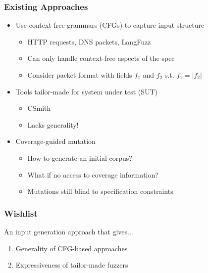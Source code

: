\documentclass[11pt,xcolor={dvipsnames},hyperref={pdftex,pdfpagemode=UseNone,hidelinks,pdfdisplaydoctitle=true},usepdftitle=false]{beamer}
\newcommand{\green}[1]{\textcolor{green!60!black}{#1}}
\newcommand{\blue}[1]{\textcolor{blue!70!black}{#1}}
\begin{document}
\begin{frame} 
    \frametitle{Existing Approaches} 
    \begin{itemize}
        \item Use \green{context-free grammars} (CFGs) to capture input structure \pause
        \begin{itemize}
            \item HTTP requests, DNS packets, LangFuzz\pause
            \item Can only handle context-free aspects of the spec\pause
            \item Consider packet format with fields 
            \blue{$f_1$} and \blue{$f_2$} s.t. \blue{$f_1 = |f_2|$}\pause
        \end{itemize}
        \item Tools tailor-made for \green{system under test} (SUT)\pause
        \begin{itemize}
            \item CSmith\pause
            \item Lacks generality!\pause
        \end{itemize}
        \item \green{Coverage-guided mutation}\pause
        \begin{itemize}
            \item How to generate an initial corpus?\pause
            \item What if no access to coverage information?\pause
            \item Mutations still blind to specification constraints
        \end{itemize}
    \end{itemize}
\end{frame}

\begin{frame} 
    \frametitle{Wishlist} 
    An input generation approach that gives...\pause
    \begin{enumerate}
        \item Generality of CFG-based approaches\pause
        \item Expressiveness of tailor-made fuzzers\pause
    \end{enumerate}
\end{frame}
\end{document}
